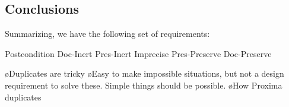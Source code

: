 \subsection{Conclusions}

Summarizing, we have the following set of requirements:

		{Postcondition}
  {Doc-Inert}
		{Pres-Inert}
	{Imprecise}
	{Pres-Preserve}
	{Doc-Preserve}

\toHere

\bl
\o Duplicates are tricky
\o Easy to make impossible situations, but not a design requirement to solve these. Simple things should be possible.
\o How Proxima duplicates
\el









%																
%																
%																


%																
%																
%																


